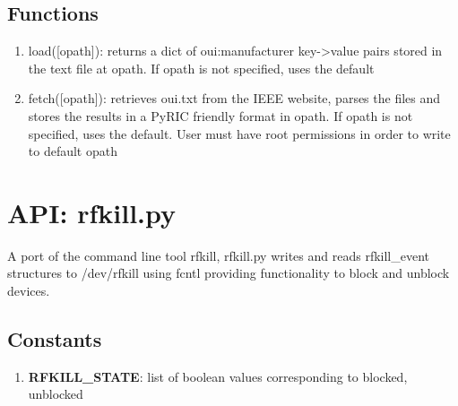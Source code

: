 \documentclass[11pt]{article}
\begin{document}
\begin{appendices}
\subsection{Functions}
\begin{enumerate}
\item load([opath]): returns a dict of oui:manufacturer key->value pairs stored
in the text file at opath. If opath is not specified, uses the default
\item fetch([opath]): retrieves oui.txt from the IEEE website, parses the files
and stores the results in a PyRIC friendly format in opath. If opath is not 
specified, uses the default. User must have root permissions in order to write
to default opath 
\end{enumerate}

\section{API: rfkill.py}\label{sec:rfkillapi}
A port of the command line tool rfkill, rfkill.py writes and reads rfkill\_event 
structures to /dev/rfkill using fcntl providing functionality to block and unblock 
devices. 

\subsection{Constants}
\begin{enumerate}
\item \textbf{RFKILL\_STATE}: list of boolean values corresponding to blocked, 
unblocked
\end{enumerate}


\end{appendices}
\end{document}
